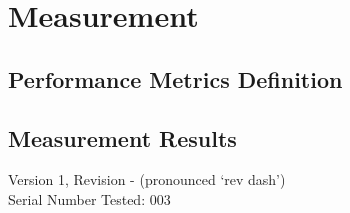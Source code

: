 \newpage
\section{Measurement}

\label{sec:measurement}

\subsection{Performance Metrics Definition}
\label{subsec:meas_desc}


\subsection{Measurement Results}
\label{subsec:meas_results}

Version 1, Revision - (pronounced `rev dash') \\
\noindent Serial Number Tested: 003

